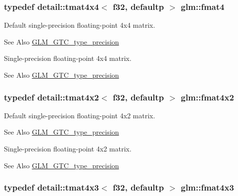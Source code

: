 \hypertarget{group__gtc__type__precision_gafbea1649c5384f13ff4595c9d0003a68}{
\subsubsection[{fmat4}]{\setlength{\rightskip}{0pt plus 5cm}typedef detail\-::tmat4x4$<$ f32, defaultp $>$ {\bf glm\-::fmat4}}}\label{group__gtc__type__precision_gafbea1649c5384f13ff4595c9d0003a68}
Default single-\/precision floating-\/point 4x4 matrix. \begin{DoxySeeAlso}{See Also}
\hyperlink{group__gtc__type__precision}{G\-L\-M\-\_\-\-G\-T\-C\-\_\-type\-\_\-precision}
\end{DoxySeeAlso}
Single-\/precision floating-\/point 4x4 matrix. \begin{DoxySeeAlso}{See Also}
\hyperlink{group__gtc__type__precision}{G\-L\-M\-\_\-\-G\-T\-C\-\_\-type\-\_\-precision} 
\end{DoxySeeAlso}
\hypertarget{group__gtc__type__precision_ga0cf4b66f4929b3c21ab7b967386fc7dd}{
\subsubsection[{fmat4x2}]{\setlength{\rightskip}{0pt plus 5cm}typedef detail\-::tmat4x2$<$ f32, defaultp $>$ {\bf glm\-::fmat4x2}}}\label{group__gtc__type__precision_ga0cf4b66f4929b3c21ab7b967386fc7dd}
Default single-\/precision floating-\/point 4x2 matrix. \begin{DoxySeeAlso}{See Also}
\hyperlink{group__gtc__type__precision}{G\-L\-M\-\_\-\-G\-T\-C\-\_\-type\-\_\-precision}
\end{DoxySeeAlso}
Single-\/precision floating-\/point 4x2 matrix. \begin{DoxySeeAlso}{See Also}
\hyperlink{group__gtc__type__precision}{G\-L\-M\-\_\-\-G\-T\-C\-\_\-type\-\_\-precision} 
\end{DoxySeeAlso}
\hypertarget{group__gtc__type__precision_ga5af77d2574bca528d321fbf261c90107}{
\subsubsection[{fmat4x3}]{\setlength{\rightskip}{0pt plus 5cm}typedef detail\-::tmat4x3$<$ f32, defaultp $>$ {\bf glm\-::fmat4x3}}}\label{group__gtc__type__precision_ga5af77d2574bca528d321fbf261c90107}
